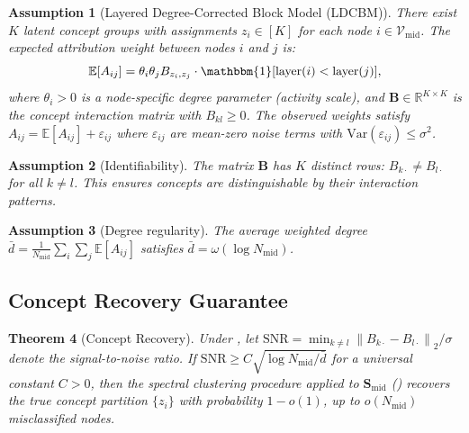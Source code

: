 \documentclass[11pt]{article}
\newtheorem{theorem}{Theorem}[section]
\newtheorem{assumption}[theorem]{Assumption}
\newcommand{\cV}{\mathcal{V}}
\newcommand{\bB}{\mathbf{B}}
\newcommand{\bS}{\mathbf{S}}
\newcommand{\R}{\mathbb{R}}
\newcommand{\E}{\mathbb{E}}
\newcommand{\1}{\mathbbm{1}}
\newcommand{\eps}{\varepsilon}
\newcommand{\norm}[1]{\left\lVert #1 \right\rVert}
\begin{document}
\begin{assumption}[Layered Degree-Corrected Block Model (LDCBM)]
\label{ass:block}
  There exist $K$ latent concept groups with assignments $z_i \in [K]$ for each node $i \in \cV_{\mathrm{mid}}$.
  The expected attribution weight between nodes $i$ and $j$ is:
  \begin{equation}
    \E[A_{ij}] = \theta_i \theta_j B_{z_i, z_j} \cdot \1[\mathrm{layer}(i) < \mathrm{layer}(j)],
    \label{eq:ldcbm}
  \end{equation}
  where $\theta_i > 0$ is a node-specific degree parameter (activity scale), and $\bB \in \R^{K \times K}$ is the concept interaction matrix with $B_{kl} \ge 0$.
  The observed weights satisfy $A_{ij} = \E[A_{ij}] + \eps_{ij}$ where $\eps_{ij}$ are mean-zero noise terms with $\mathrm{Var}(\eps_{ij}) \le \sigma^2$.
\end{assumption}

\begin{assumption}[Identifiability]
\label{ass:ident}
  The matrix $\bB$ has $K$ distinct rows: $B_{k\cdot} \ne B_{l\cdot}$ for all $k \ne l$.
  This ensures concepts are distinguishable by their interaction patterns.
\end{assumption}

\begin{assumption}[Degree regularity]
\label{ass:degree}
  The average weighted degree $\bar{d} = \frac{1}{N_{\mathrm{mid}}} \sum_i \sum_j \E[A_{ij}]$ satisfies $\bar{d} = \omega(\log N_{\mathrm{mid}})$.
\end{assumption}

\subsection{Concept Recovery Guarantee}
\label{sec:recovery}

\begin{theorem}[Concept Recovery]
\label{thm:recovery}
  Under , let $\mathrm{SNR} = \min_{k \ne l} \norm{B_{k\cdot} - B_{l\cdot}}_2 / \sigma$ denote the signal-to-noise ratio.
  If $\mathrm{SNR} \ge C \sqrt{\log N_{\mathrm{mid}} / \bar{d}}$ for a universal constant $C > 0$, then the spectral clustering procedure applied to $\bS_{\mathrm{mid}}$ () recovers the true concept partition $\{z_i\}$ with probability $1 - o(1)$, up to $o(N_{\mathrm{mid}})$ misclassified nodes.
\end{theorem}
\end{document}
